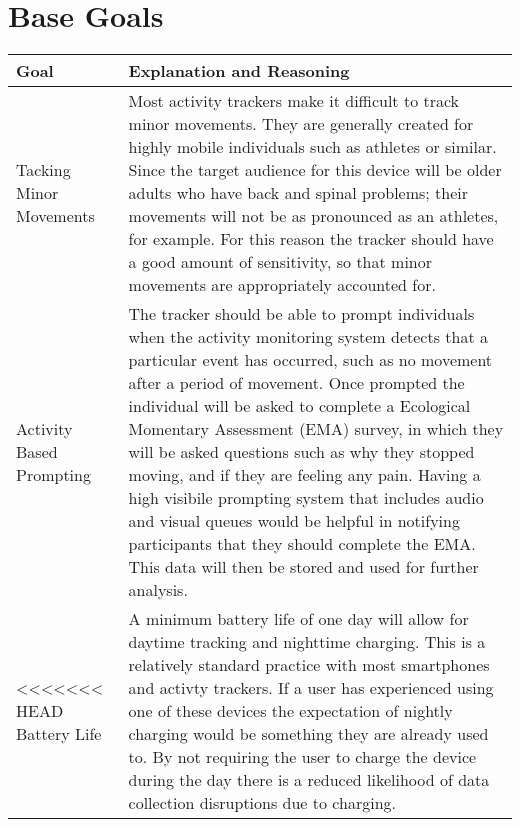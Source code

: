 \documentclass[12pt]{article}
\begin{document}
\section{Base Goals}
\begin{center}
    \begin{tabular}{ | m{7em} | m{32em}| }
        \hline
        \textbf{Goal}                                    & \textbf{Explanation and Reasoning}                                                                                                                                                                                                                                                                                                                                                                                                                                                                                                                                                               \\
        \hline
        Tacking Minor Movements                          & Most activity trackers make it difficult to track minor movements.
        They are generally created for highly mobile individuals such as athletes or similar. Since the target audience for this device will be older adults who have back and spinal problems; their movements will not be as pronounced as an athletes, for example. For this reason the tracker should have a good amount of sensitivity, so that minor movements are appropriately accounted for.                                                                                                                                                                                                                                                       \\
        \hline
        Activity Based Prompting                            & The tracker should be able to prompt individuals when the activity monitoring system detects that a particular event has occurred, such as no movement after a period of movement.  Once prompted the individual will be asked to complete a Ecological Momentary Assessment (EMA) survey, in which they will be asked questions such as why they stopped moving, and if they are feeling any pain. Having a high visibile prompting system that includes audio and visual queues would be helpful in notifying participants that they should complete the EMA. This data will then be stored and used for further analysis. \\
        \hline
<<<<<<< HEAD
        Battery Life                                     & A minimum battery life of one day will allow for daytime tracking and nighttime charging. This is a relatively standard practice with most smartphones and activty trackers. If a user has experienced using one of these devices the expectation of nightly charging would be something they are already used to. By not requiring the user to charge the device during the day there is a reduced likelihood of data collection disruptions due to charging.                                                                                                                                   \\

\end{tabular}
\end{center}
\end{document}

